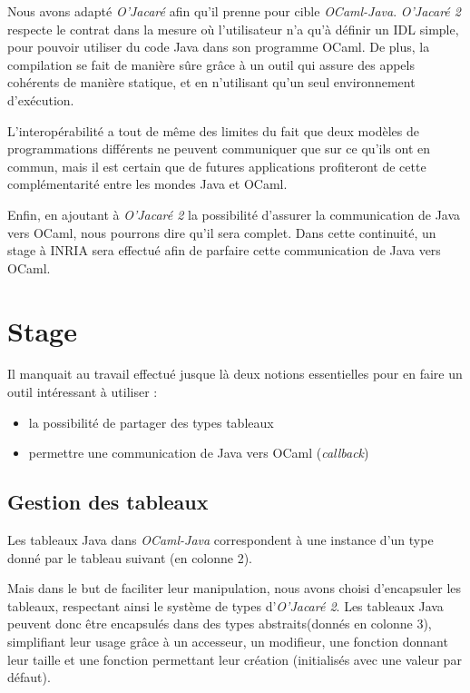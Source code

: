 \documentclass[a4paper, 11pt]{article}
\begin{document}
Nous avons adapté \emph{O'Jacaré} afin qu'il prenne pour cible
\emph{OCaml-Java}.  \emph{O'Jacaré 2} respecte le contrat dans la
mesure où l'utilisateur n'a qu'à définir un IDL simple, pour pouvoir
utiliser du code Java dans son programme OCaml.  De plus, la
compilation se fait de manière sûre grâce à un outil qui assure des
appels cohérents de manière statique, et en n'utilisant qu'un seul environnement d'exécution.

L'interopérabilité a tout de même des limites du fait que deux modèles
de programmations différents ne peuvent communiquer que sur ce qu'ils
ont en commun, mais il est certain que de futures applications
profiteront de cette complémentarité entre les mondes Java et OCaml.

Enfin, en ajoutant à \emph{O'Jacaré 2} la possibilité d'assurer la
communication de Java vers OCaml, nous pourrons dire qu'il
sera complet. Dans cette continuité, un stage à INRIA sera effectué afin de parfaire cette communication de Java vers OCaml.








\newpage
\section{Stage}

Il manquait au travail effectué jusque là deux notions essentielles pour en faire un outil intéressant à utiliser :
\begin{itemize}
\item la possibilité de partager des types tableaux
\item permettre une communication de Java vers OCaml (\emph{callback})
\end{itemize} 

\subsection{Gestion des tableaux}
Les tableaux Java dans \emph{OCaml-Java} correspondent à une instance d'un type donné par le tableau suivant (en colonne 2).

Mais dans le but de faciliter leur manipulation, nous avons choisi d'encapsuler les tableaux, respectant ainsi le système de types d'\emph{O'Jacaré 2}.
Les tableaux Java peuvent donc être encapsulés dans des types abstraits(donnés en colonne 3), simplifiant leur usage grâce à un accesseur, un modifieur, une fonction donnant leur taille et une fonction permettant leur création (initialisés avec une valeur par défaut).
\newline
\end{document}
